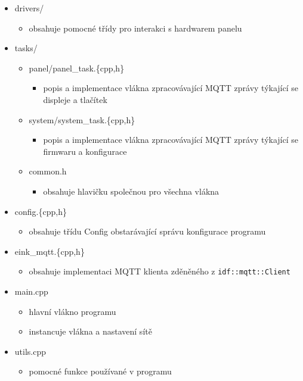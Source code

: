 \begin{itemize}
    \item drivers/
    \begin{itemize}
        \item obsahuje pomocné třídy pro interakci s hardwarem panelu
    \end{itemize}
    \item tasks/
    \begin{itemize}
        \item panel/panel\_task.\{cpp,h\}
        \begin{itemize}
            \item popis a implementace vlákna zpracovávající MQTT zprávy týkající se displeje a tlačítek
        \end{itemize}
        \item system/system\_task.\{cpp,h\}
        \begin{itemize}
            \item popis a implementace vlákna zpracovávající MQTT zprávy týkající se firmwaru a konfigurace
        \end{itemize}
        \item common.h
            \begin{itemize}
                \item obsahuje hlavičku společnou pro všechna vlákna
            \end{itemize}
    \end{itemize}
    \item config.\{cpp,h\}
    \begin{itemize}
        \item obsahuje třídu Config obstarávající správu konfigurace programu
    \end{itemize}
    \item eink\_mqtt.\{cpp,h\}
    \begin{itemize}
        \item obsahuje implementaci MQTT klienta zděněného z \lstinline|idf::mqtt::Client|
    \end{itemize}
    \item main.cpp
    \begin{itemize}
        \item hlavní vlákno programu
        \item instancuje vlákna a nastavení sítě
    \end{itemize}
    \item utils.cpp
    \begin{itemize}
        \item pomocné funkce používané v programu
    \end{itemize}
\end{itemize}

